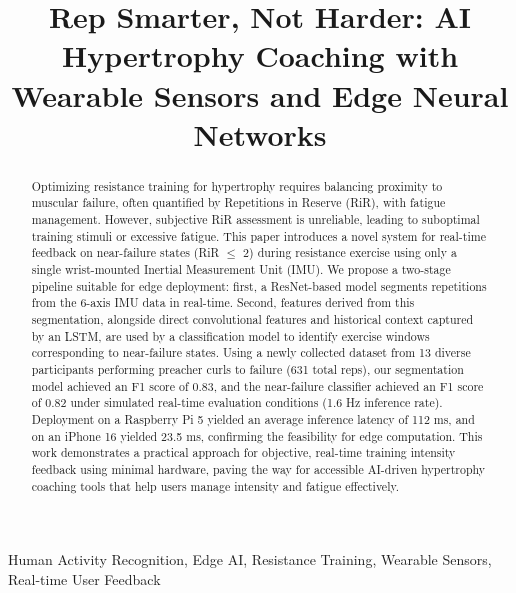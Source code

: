 \documentclass[conference]{IEEEtran}
\begin{document}
\title{Rep Smarter, Not Harder: AI Hypertrophy Coaching with Wearable Sensors and Edge Neural Networks\\}

\maketitle
\thispagestyle{plain}
\pagestyle{plain}

\begin{abstract}
    Optimizing resistance training for hypertrophy requires balancing proximity to muscular failure, often quantified by Repetitions in Reserve (RiR), with fatigue management. However, subjective RiR assessment is unreliable, leading to suboptimal training stimuli or excessive fatigue. This paper introduces a novel system for real-time feedback on near-failure states (RiR $\le$ 2) during resistance exercise using only a single wrist-mounted Inertial Measurement Unit (IMU). We propose a two-stage pipeline suitable for edge deployment: first, a ResNet-based model segments repetitions from the 6-axis IMU data in real-time. Second, features derived from this segmentation, alongside direct convolutional features and historical context captured by an LSTM, are used by a classification model to identify exercise windows corresponding to near-failure states. Using a newly collected dataset from 13 diverse participants performing preacher curls to failure (631 total reps), our segmentation model achieved an F1 score of 0.83, and the near-failure classifier achieved an F1 score of 0.82 under simulated real-time evaluation conditions (1.6 Hz inference rate). Deployment on a Raspberry Pi 5 yielded an average inference latency of 112 ms, and on an iPhone 16 yielded 23.5 ms, confirming the feasibility for edge computation. This work demonstrates a practical approach for objective, real-time training intensity feedback using minimal hardware, paving the way for accessible AI-driven hypertrophy coaching tools that help users manage intensity and fatigue effectively.
\end{abstract}

\begin{IEEEkeywords}
    Human Activity Recognition, Edge AI, Resistance Training, Wearable Sensors, Real-time User Feedback
\end{IEEEkeywords}
\end{document}
